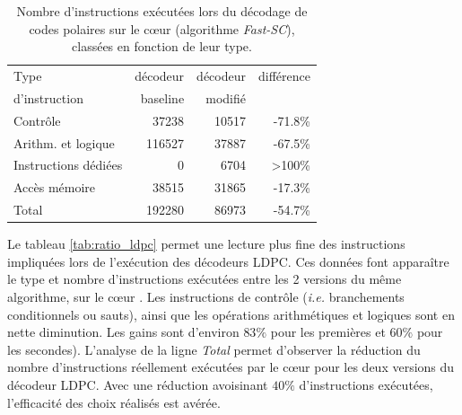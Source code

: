 \documentclass[../main.tex]{subfiles}
\begin{document}
  \begin{table}[!tb]
    \centering
    \footnotesize
    \begin{tabular}{lrrr}
      \toprule
      Type                  & décodeur & décodeur & différence \\
      d'instruction         & baseline & modifié  & \\
      \cmidrule(l){2-4}
      Contrôle              & 37238     & 10517   & -71.8\% \\
      Arithm. et logique    & 116527    & 37887   & -67.5\% \\
      Instructions dédiées  &     0     & 6704    &  >100\% \\
      Accès mémoire         & 38515     & 31865   &  -17.3\%\\
      \cmidrule(l){2-4}
      Total                 & 192280    & 86973   & -54.7\%  \\ 
      \bottomrule
    \end{tabular}
    \caption{Nombre d'instructions exécutées lors du décodage de codes polaires sur le cœur \PicoRV\space  (algorithme \textit{Fast-SC}), classées en fonction de leur type.}
    \label{tab:ratio_polaire}
  \end{table}

Le tableau \ref{tab:ratio_ldpc} permet une lecture plus fine des instructions impliquées lors de l'exécution des décodeurs LDPC. Ces données font apparaître le type et nombre d'instructions exécutées entre les 2 versions du même algorithme, sur le cœur \PicoRV. 
Les instructions de contrôle (\textit{i.e.} branchements conditionnels ou sauts), ainsi que les opérations arithmétiques et logiques sont en nette diminution. Les gains sont d'environ $83\%$ pour les premières et $60\%$ pour les secondes).
L'analyse de la ligne \textit{Total} permet d'observer la réduction du nombre d'instructions réellement exécutées par le cœur \PicoRV\space pour les deux versions du décodeur LDPC. Avec une réduction avoisinant $40\%$ d'instructions exécutées, l'efficacité des choix réalisés est avérée.
\end{document}
